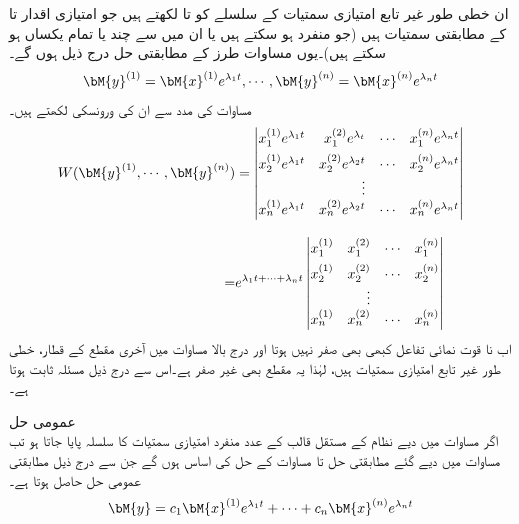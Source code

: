 ان خطی طور غیر تابع امتیازی سمتیات کے سلسلے کو  تا  لکھتے ہیں جو امتیازی اقدار  تا  کے مطابقتی سمتیات ہیں (جو منفرد ہو سکتے ہیں یا ان میں سے چند یا تمام یکساں ہو سکتے ہیں)۔یوں مساوات  طرز کے مطابقتی حل درج ذیل ہوں  گے۔
\begin{align}\label{مساوات_نظام_مستقل_عددی_سر_نظام_ت}
\bM{y}^{(1)}=\bM{x}^{(1)}e^{\lambda_1 t}, \cdots, \bM{y}^{(n)}=\bM{x}^{(n)}e^{\lambda_n t}
\end{align}
مساوات  کی مدد سے ان کی ورونسکی  لکھتے ہیں۔
\begin{gather}\label{مساوات_نظام_مستقل_عددی_سر_نظام_ٹ}
\begin{aligned}
W(\bM{y}^{(1)},\cdots,\bM{y}^{(n)})&=
\begin{vmatrix*}[r]
x_1^{(1)} e^{\lambda_1 t}& x_1^{(2)} e^{\lambda_ t} &\cdots&x_1^{(n)} e^{\lambda_n t}\\[1ex]
x_2^{(1)} e^{\lambda_1 t}& x_2^{(2)} e^{\lambda_2 t} &\cdots&x_2^{(n)} e^{\lambda_n t}\\
& \vdots & &\\
x_n^{(1)} e^{\lambda_1 t}& x_n^{(2)}  e^{\lambda_2 t}&\cdots&x_n^{(n)} e^{\lambda_n t}
\end{vmatrix*}\\[2ex]
=&e^{\lambda_1t+ \cdots+\lambda_n t}
\begin{vmatrix*}[r]
x_1^{(1)}& x_1^{(2)} &\cdots&x_1^{(n)} \\[1ex]
x_2^{(1)} & x_2^{(2)}  &\cdots&x_2^{(n)} \\
& \vdots & &\\
x_n^{(1)} & x_n^{(2)} &\cdots&x_n^{(n)} 
\end{vmatrix*}
\end{aligned}
\end{gather}
اب نا قوت نمائی تفاعل کبھی بھی صفر نہیں ہوتا اور درج بالا مساوات میں آخری مقطع کے قطار، خطی طور غیر تابع امتیازی سمتیات ہیں، لہٰذا یہ مقطع بھی غیر صفر ہے۔اس سے درج ذیل مسئلہ ثابت ہوتا ہے۔

\quad عمومی حل\\
اگر  مساوات  میں دیے نظام کے مستقل قالب  کے  عدد منفرد امتیازی سمتیات کا سلسلہ پایا جاتا ہو تب مساوات  میں دیے گئے مطابقتی حل  تا  مساوات  کے حل کی اساس ہوں گے جن سے درج ذیل مطابقتی عمومی حل حاصل ہوتا ہے۔
\begin{align}
\bM{y}=c_1\bM{x}^{(1)}e^{\lambda_1 t}+\cdots+c_n\bM{x}^{(n)}e^{\lambda_n t}
\end{align} 

